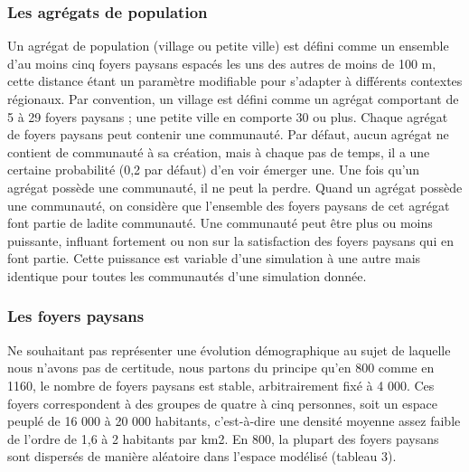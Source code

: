 \documentclass[12pt, a4paper, oneside]{book}
\begin{document}
	\subsubsection{Les agrégats de population}
	
	Un agrégat de population (village ou petite ville) est défini comme un ensemble d'au moins cinq foyers paysans espacés les uns des autres de moins de 100 m, cette distance étant un paramètre modifiable pour s'adapter à différents contextes régionaux.
	Par convention, un village est défini comme un agrégat comportant de 5 à 29 foyers paysans ; une petite ville en comporte 30 ou plus.
	Chaque agrégat de foyers paysans peut contenir une communauté.
	Par défaut, aucun agrégat ne contient de communauté à sa création, mais à chaque pas de temps, il a une certaine probabilité (0,2 par défaut) d'en voir émerger une.
	Une fois qu'un agrégat possède une communauté, il ne peut la perdre.
	Quand un agrégat possède une communauté, on considère que l'ensemble des foyers paysans de cet agrégat font partie de ladite communauté.
	Une communauté peut être plus ou moins puissante, influant fortement ou non sur la satisfaction des foyers paysans qui en font partie.
	Cette puissance est variable d'une simulation à une autre mais identique pour toutes les communautés d'une simulation donnée.
	
	
	\subsubsection{Les foyers paysans}
	
	Ne souhaitant pas représenter une évolution démographique au sujet de laquelle nous n'avons pas de certitude, nous partons du principe qu'en 800 comme en 1160, le nombre de foyers paysans est stable, arbitrairement fixé à 4 000.
	Ces foyers correspondent à des groupes de quatre à cinq personnes, soit un espace peuplé de 16 000 à 20 000 habitants, c'est-à-dire une densité moyenne assez faible de l'ordre de 1,6 à 2 habitants par km2.
	En 800, la plupart des foyers paysans sont dispersés de manière aléatoire dans l'espace modélisé (tableau 3).
	
\end{document}
